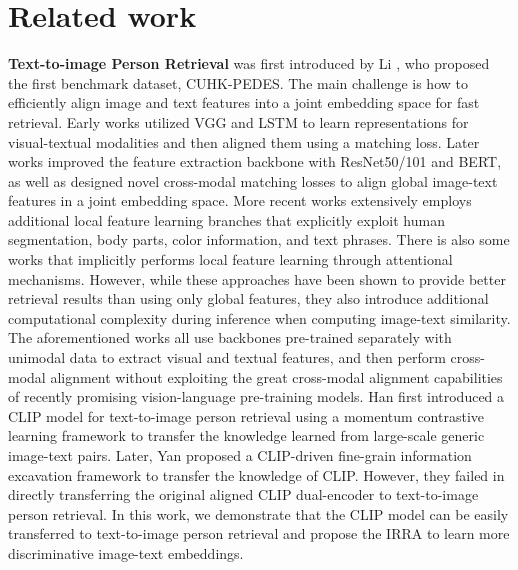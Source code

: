 \documentclass[10pt,twocolumn,letterpaper]{article}
\begin{document}
\section{Related work}
\textbf{Text-to-image Person Retrieval} was first introduced by Li \etal \cite{li2017person}, who proposed the first benchmark dataset, CUHK-PEDES\cite{li2017person}. 
The main challenge is how to efficiently align image and text features into a joint embedding space for fast retrieval.
Early works\cite{li2017identity,li2017person, chen2018improving} utilized VGG\cite{simonyan2014very} and LSTM\cite{hochreiter1997long} to learn representations for visual-textual modalities and then aligned them using a matching loss. Later works\cite{zhang2018deep, chen2021cross, sarafianos2019adversarial} improved the feature extraction backbone with ResNet50/101\cite{he2016deep} and BERT\cite{kenton2019bert}, as well as designed novel cross-modal matching losses to align global image-text features in a joint embedding space. More recent works\cite{zhu2021dssl, wang2020vitaa, wu2021lapscore, chen2022tipcb, wang2022caibc} extensively employs additional local feature learning branches that explicitly exploit human segmentation, body parts, color information, and text phrases. There is also some works \cite{farooq2022axm, ding2021semantically, shao2022learning, yan2022image} that implicitly performs local feature learning through attentional mechanisms. However, while these approaches have been shown to provide better retrieval results than using only global features, they also introduce additional computational complexity during inference when computing image-text similarity. The aforementioned works all use backbones pre-trained separately with unimodal data to extract visual and textual features, and then perform cross-modal alignment without exploiting the great cross-modal alignment capabilities of recently promising vision-language pre-training models.
Han \etal \cite{han2021text} first introduced a CLIP model for text-to-image person retrieval using a momentum contrastive learning framework to transfer the knowledge learned from large-scale generic image-text pairs. Later, Yan \etal \cite{yan2022clip} proposed a CLIP-driven fine-grain information excavation framework to transfer the knowledge of CLIP. 
However, they failed in directly transferring the original aligned CLIP dual-encoder to text-to-image person retrieval.
In this work, we demonstrate that the CLIP model can be easily transferred to text-to-image person retrieval and propose the IRRA to learn more discriminative image-text embeddings.
\end{document}
